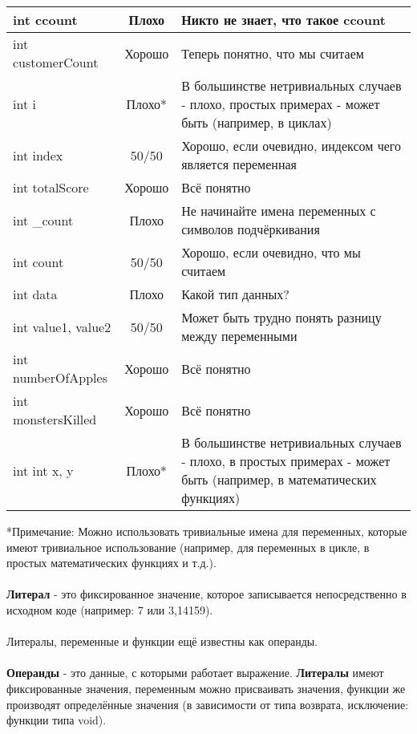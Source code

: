 \documentclass[a4paper,16pt]{report} %
\begin{document}
\begin{tabular}{ | l | c | >{\raggedright\arraybackslash}p{}| } %
	\hline
	int ccount & Плохо & Никто не знает, что такое ccount  \\ \hline %
	int customerCount & Хорошо & Теперь понятно, что мы считаем \\ \hline
	int i & Плохо* & В большинстве нетривиальных случаев - плохо, 
	простых примерах - может быть (например, в циклах) \\ \hline
	int index & 50/50 & Хорошо, если очевидно, индексом чего является переменная\\ \hline
	int totalScore & Хорошо & Всё понятно \\ \hline
	int \_count & Плохо & Не начинайте имена переменных с символов подчёркивания\\ \hline
	int count & 50/50 & Хорошо, если очевидно, что мы считаем \\ \hline
	int data & Плохо & Какой тип данных? \\ \hline
	int value1, value2 & 50/50 & Может быть трудно понять разницу между переменными \\ \hline
	int numberOfApples & Хорошо & Всё понятно \\ \hline
	int monstersKilled & Хорошо & Всё понятно \\ \hline
	int int x, y & Плохо* & В большинстве нетривиальных случаев - плохо, 
	в простых примерах - может быть (например, в математических функциях) \\ \hline
\end{tabular}
\newline %
\newline
\newline
*Примечание: Можно использовать тривиальные имена для переменных,
которые имеют тривиальное использование (например, для переменных в
цикле, в простых математических функциях и т.д.).
\\ \\
\textbf{Литерал} - это фиксированное значение, которое записывается непосредственно в исходном коде (например: 7 или 3,14159).
\\ \\
Литералы, переменные и функции ещё известны как операнды.
\\ \\
\textbf{Операнды} - это данные, с которыми работает выражение. \textbf{Литералы} имеют фиксированные значения, переменным можно присваивать значения, функции же производят определённые значения (в зависимости от типа возврата, исключение: функции типа void).
\end{document}
